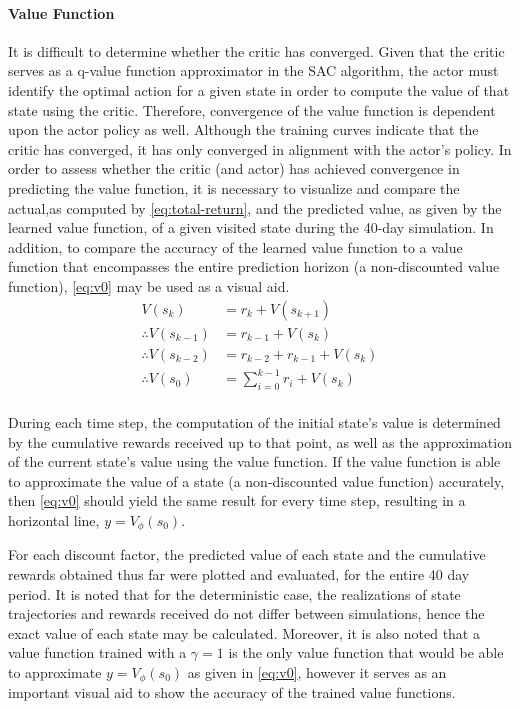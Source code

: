 \paragraph{Value Function}
It is difficult to determine whether the critic has converged. Given that the critic serves as a q-value function approximator in the SAC algorithm, the actor must identify the optimal action for a given state in order to compute the value of that state using the critic. Therefore, convergence of the value function is dependent upon the actor policy as well. Although the training curves indicate that the critic has converged, it has only converged in alignment with the actor's policy. In order to assess whether the critic (and actor) has achieved convergence in predicting the value function, it is necessary to visualize and compare the actual,as computed by \autoref{eq:total-return}, and the predicted value, as given by the learned value function, of a given visited state during the 40-day simulation. In addition, to compare the accuracy of the learned value function to a value function that encompasses the entire prediction horizon (a non-discounted value function), \autoref{eq:v0} may be used as a visual aid.\\

\begin{equation}\label{eq:v0}
	\begin{aligned}
		V(s_k) &= r_k + V(s_{k+1}) \\
		\therefore V(s_{k-1}) &= r_{k-1} + V(s_{k}) \\
		\therefore V(s_{k-2}) &= r_{k-2} + r_{k-1} + V(s_{k}) \\
		\therefore V(s_{0}) &= \sum_{i=0}^{k-1} {r_{i}} + V(s_{k})   \\
	\end{aligned}
\end{equation}

During each time step, the computation of the initial state's value is determined by the cumulative rewards received up to that point, as well as the approximation of the current state's value using the value function. If the value function is able to approximate the value of a state (a non-discounted value function) accurately, then \autoref{eq:v0} should yield the same result for every time step, resulting in a horizontal line, $y = V_\phi(s_0)$.

For each discount factor, the predicted value of each state and the cumulative rewards obtained thus far were plotted and evaluated, for the entire 40 day period. It is noted that for the deterministic case, the realizations of state trajectories and rewards received do not differ between simulations, hence the exact value of each state may be calculated. Moreover, it is also noted that a value function trained with a $\gamma=1$ is the only value function that would be able to approximate  $y = V_\phi(s_0)$ as given in \autoref{eq:v0}, however it serves as an important visual aid to show the accuracy of the trained value functions.

